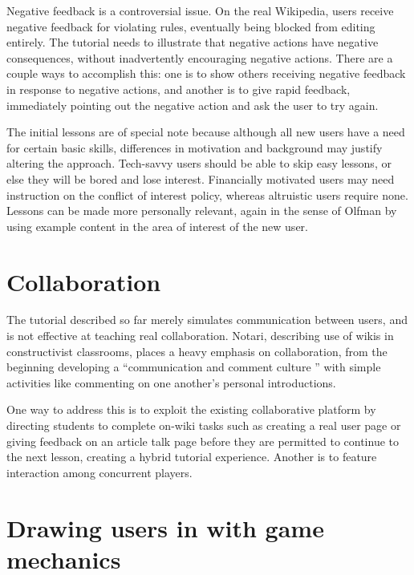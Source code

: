 \documentclass{acm_proc_article-sp}
\begin{document}
Negative feedback is a controversial issue. On the real Wikipedia, users receive negative feedback for violating rules, eventually being blocked from editing entirely. The tutorial needs to illustrate that negative actions have negative consequences, without inadvertently encouraging negative actions. There are a couple ways to accomplish this: one is to show others receiving negative feedback in response to negative actions, and another is to give rapid feedback, immediately pointing out the negative action and ask the user to try again.

The initial lessons are of special note because although all new users have a need for certain basic skills, differences in motivation and background may justify altering the approach. Tech-savvy users should be able to skip easy lessons, or else they will be bored and lose interest.  Financially motivated users may need instruction on the conflict of interest policy, whereas altruistic users require none. Lessons can be made more personally relevant, again in the sense of Olfman\cite{Olfman:1991} by using example content in the area of interest of the new user.

\section{Collaboration}

The tutorial described so far merely simulates communication between users, and is not effective at teaching real collaboration. Notari,\cite{Notari:2006} describing use of wikis in constructivist classrooms, places a heavy emphasis on collaboration, from the beginning developing a ``communication and comment culture '' with simple activities like commenting on one another's personal introductions.

One way to address this is to exploit the existing collaborative platform by directing students to complete on-wiki tasks such as creating a real user page or giving feedback on an article talk page before they are permitted to continue to the next lesson, creating a hybrid tutorial experience. Another is to feature interaction among concurrent players.

\section{Drawing users in with game mechanics}
\end{document}
